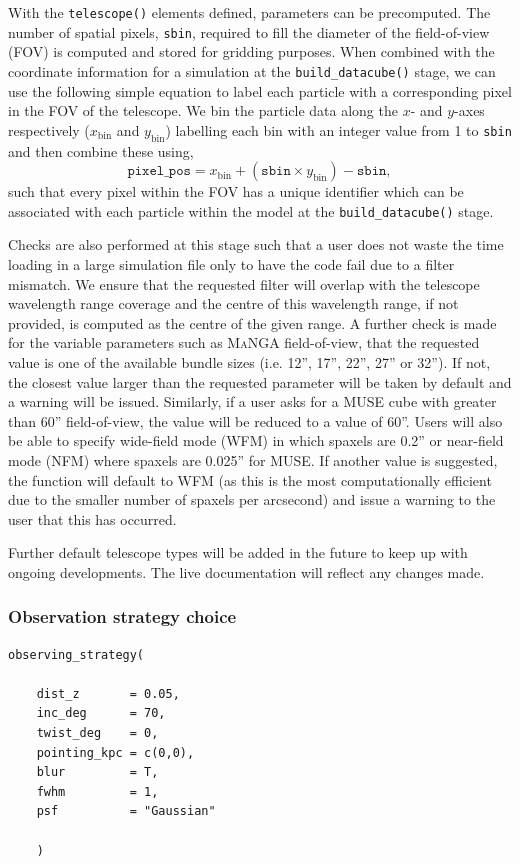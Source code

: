 \documentclass[
  journal=pasa,
  manuscript=research-paper, %
  year=2020,
  volume=37,
]{cup-journal}
\newcommand{\telescope}[1]{\texttt{telescope()}#1}
\newcommand{\builddatacube}[1]{\texttt{build\_datacube()}#1}
\begin{document}
With the \telescope{} elements defined, parameters can be precomputed. 
The number of spatial pixels, \texttt{sbin}, required to fill the diameter of the field-of-view (FOV) is computed and stored for gridding purposes. 
When combined with the coordinate information for a simulation at the \builddatacube{} stage, we can use the following simple equation to label each particle with a corresponding pixel in the FOV of the telescope. 
We bin the particle data along the $x$- and $y$-axes respectively ($x_{\text{bin}}$ and $y_{\text{bin}}$) labelling each bin with an integer value from 1 to \texttt{sbin} and then combine these using,
\begin{equation}
    \texttt{pixel\_pos} = x_{\text{bin}} + (\texttt{sbin} \times y_{\text{bin}}) - \texttt{sbin},
\end{equation}
such that every pixel within the FOV has a unique identifier which can be associated with each particle within the model at the \builddatacube{} stage.

Checks are also performed at this stage such that a user does not waste the time loading in a large simulation file only to have the code fail due to a filter mismatch.
We ensure that the requested filter will overlap with the telescope wavelength range coverage and the centre of this wavelength range, if not provided, is computed as the centre of the given range. 
A further check is made for the variable parameters such as \textsc{MaNGA} field-of-view, that the requested value is one of the available bundle sizes (i.e. 12'', 17'', 22'', 27'' or 32''). 
If not, the closest value larger than the requested parameter will be taken by default and a warning will be issued.
Similarly, if a user asks for a MUSE cube with greater than 60'' field-of-view, the value will be reduced to a value of 60''. 
Users will also be able to specify wide-field mode (WFM) in which spaxels are 0.2'' or near-field mode (NFM) where spaxels are 0.025'' for MUSE. 
If another value is suggested, the function will default to WFM (as this is the most computationally efficient due to the smaller number of spaxels per arcsecond) and issue a warning to the user that this has occurred. 

Further default telescope types will be added in the future to keep up with ongoing developments.
The live documentation will reflect any changes made.

\subsubsection{Observation strategy choice} \label{sec:observation}
\begin{lstlisting}[basicstyle=\fontsize{10}{8}\selectfont\ttfamily]
observing_strategy(

    dist_z       = 0.05,   
    inc_deg      = 70,     
    twist_deg    = 0,      
    pointing_kpc = c(0,0),  
    blur         = T,      
    fwhm         = 1,
    psf          = "Gaussian"
    
    )      
\end{lstlisting}
\end{document}
